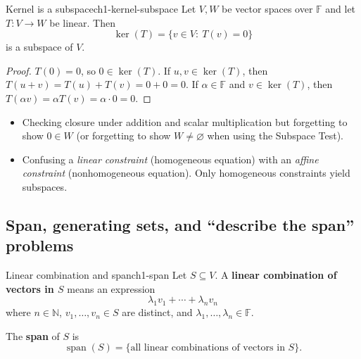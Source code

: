 \begin{theorem}{Kernel is a subspace}{ch1-kernel-subspace}
Let $V,W$ be vector spaces over $\mathbb{F}$ and let $T:V\to W$ be linear.
Then
\[
\ker(T)=\{v\in V:\ T(v)=0\}
\]
is a subspace of $V$.
\begin{proof}
$T(0)=0$, so $0\in\ker(T)$. If $u,v\in\ker(T)$, then $T(u+v)=T(u)+T(v)=0+0=0$.
If $\alpha\in\mathbb{F}$ and $v\in\ker(T)$, then $T(\alpha v)=\alpha T(v)=\alpha\cdot 0=0$.
\end{proof}
\end{theorem}

\begin{commonmistake}
\begin{itemize}
\item Checking closure under addition and scalar multiplication but forgetting to show $0\in W$ (or forgetting to show $W\neq\varnothing$ when using the Subspace Test).
\item Confusing a \emph{linear constraint} (homogeneous equation) with an \emph{affine constraint} (nonhomogeneous equation). Only homogeneous constraints yield subspaces.
\end{itemize}
\end{commonmistake}


\subsection{Span, generating sets, and “describe the span” problems}


\begin{definition}{Linear combination and span}{ch1-span}
Let $S\subseteq V$. A \textbf{linear combination of vectors in $S$} means an expression
\[
\lambda_1 v_1+\cdots+\lambda_n v_n
\]
where $n\in\mathbb{N}$, $v_1,\ldots,v_n\in S$ are distinct, and $\lambda_1,\ldots,\lambda_n\in\mathbb{F}$.

The \textbf{span} of $S$ is
\[
\operatorname{span}(S)=\{\text{all linear combinations of vectors in }S\}.
\]
\end{definition}

